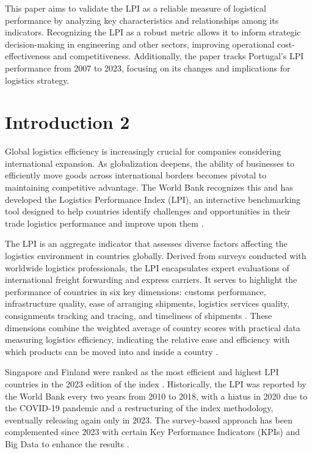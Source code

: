 \documentclass[sigconf]{acmart}
\begin{document}
This paper aims to validate the LPI as a reliable measure of logistical performance by analyzing key characteristics and relationships among its indicators. Recognizing the LPI as a robust metric allows it to inform strategic decision-making in engineering and other sectors, improving operational cost-effectiveness and competitiveness. Additionally, the paper tracks Portugal’s LPI performance from 2007 to 2023, focusing on its changes and implications for logistics strategy.

\section{Introduction 2}
Global logistics efficiency is increasingly crucial for companies considering international expansion. As globalization deepens, the ability of businesses to efficiently move goods across international borders becomes pivotal to maintaining competitive advantage. The World Bank recognizes this and has developed the Logistics Performance Index (LPI), an interactive benchmarking tool designed to help countries identify challenges and opportunities in their trade logistics performance and improve upon them \cite{WBreport2018}.

The LPI is an aggregate indicator that assesses diverse factors affecting the logistics environment in countries globally. Derived from surveys conducted with worldwide logistics professionals, the LPI encapsulates expert evaluations of international freight forwarding and express carriers. It serves to highlight the performance of countries in six key dimensions: customs performance, infrastructure quality, ease of arranging shipments, logistics services quality, consignments tracking and tracing, and timeliness of shipments \cite{WBreport2018}. These dimensions combine the weighted average of country scores with practical data measuring logistics efficiency, indicating the relative ease and efficiency with which products can be moved into and inside a country \cite{WBreport2018}.

Singapore and Finland were ranked as the most efficient and highest LPI countries in the 2023 edition of the index \cite{worldbank4}. Historically, the LPI was reported by the World Bank every two years from 2010 to 2018, with a hiatus in 2020 due to the COVID-19 pandemic and a restructuring of the index methodology, eventually releasing again only in 2023. The survey-based approach has been complemented since 2023 with certain Key Performance Indicators (KPIs) and Big Data to enhance the results \cite{WBreport2018}.
\end{document}
